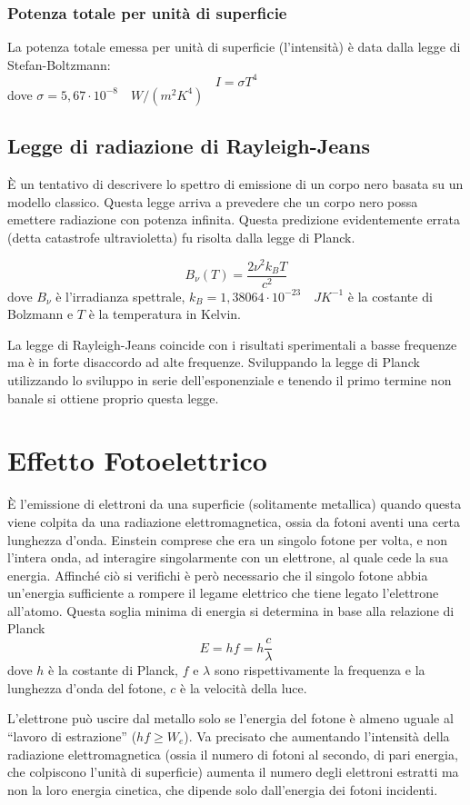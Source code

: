 \documentclass[10pt,a4paper]{article}
\begin{document}
\begin{multicols}{2}
  \subsubsection*{Potenza totale per unità di superficie}
  La potenza totale emessa per unità di superficie (l'intensità) è data dalla legge di Stefan-Boltzmann:
  $$ I = \sigma T^4 $$
  dove $\sigma = 5,67 \cdot 10^{-8} \quad W / (m^2 K^4)$

  \subsection*{Legge di radiazione di Rayleigh-Jeans}
  È un tentativo di descrivere lo spettro di emissione di un corpo nero basata su un modello classico. Questa legge arriva a prevedere che un corpo nero possa emettere radiazione con potenza infinita. Questa predizione evidentemente errata (detta catastrofe ultravioletta) fu risolta dalla legge di Planck.

  $$ B_\nu (T) = \frac{2 \nu^2 k_B T}{c^2} $$
  dove $B_\nu$ è l'irradianza spettrale, $k_B = 1,38064 \cdot 10^{-23} \quad J K^{-1}$ è la costante di Bolzmann e $T$ è la temperatura in Kelvin.

  La legge di Rayleigh-Jeans coincide con i risultati sperimentali a basse frequenze ma è in forte disaccordo ad alte frequenze. Sviluppando la legge di Planck utilizzando lo sviluppo in serie dell'esponenziale e tenendo il primo termine non banale si ottiene proprio questa legge.

  \section*{Effetto Fotoelettrico}
  È l'emissione di elettroni da una superficie (solitamente metallica) quando questa viene colpita da una radiazione elettromagnetica, ossia da fotoni aventi una certa lunghezza d'onda. Einstein comprese che era un singolo fotone per volta, e non l'intera onda, ad interagire singolarmente con un elettrone, al quale cede la sua energia. Affinché ciò si verifichi è però necessario che il singolo fotone abbia un'energia sufficiente a rompere il legame elettrico che tiene legato l'elettrone all'atomo. Questa soglia minima di energia si determina in base alla relazione di Planck
  $$ E = hf = h \frac{c}{\lambda} $$
  dove $h$ è la costante di Planck, $f$ e $\lambda$ sono rispettivamente la frequenza e la lunghezza d'onda del fotone, $c$ è la velocità della luce.

  L'elettrone può uscire dal metallo solo se l'energia del fotone è almeno uguale al ``lavoro di estrazione'' ($hf \ge W_e$). Va precisato che aumentando l'intensità della radiazione elettromagnetica (ossia il numero di fotoni al secondo, di pari energia, che colpiscono l'unità di superficie) aumenta il numero degli elettroni estratti ma non la loro energia cinetica, che dipende solo dall'energia dei fotoni incidenti.
  

\end{multicols}
\end{document}
